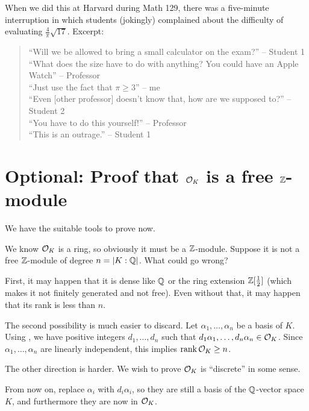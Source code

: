 \begin{remark}
	When we did this at Harvard during Math 129,
	there was a five-minute interruption in which students (jokingly) complained
	about the difficulty of evaluating $\frac{4}{\pi} \sqrt{17}$. Excerpt:
	\begin{quotation}
		\footnotesize
		``Will we be allowed to bring a small calculator on the exam?'' -- Student 1 \\
		``What does the size have to do with anything?  You could have an Apple Watch'' -- Professor \\
		``Just use the fact that $\pi \ge 3$'' -- me \\
		``Even [other professor] doesn't know that, how are we supposed to?'' -- Student 2 \\
		``You have to do this yourself!'' -- Professor \\
		``This is an outrage.'' -- Student 1
	\end{quotation}
\end{remark}

\section{Optional: Proof that $\mathcal O_K$ is a free $\mathbb Z$-module}

We have the suitable tools to prove  now.

We know $\mathcal O_K$ is a ring, so obviously it must be a $\mathbb Z$-module.
Suppose it is not a free $\mathbb Z$-module of degree $n = |K:\mathbb Q|$. What could go wrong?
\begin{itemize}
	\ii First, it may happen that it is dense like $\mathbb Q$ or the ring extension $\mathbb Z[\frac{1}{2}]$
	(which makes it not finitely generated and not free).
	\ii Even without that, it may happen that its rank is less than $n$.
\end{itemize}

The second possibility is much easier to discard.
Let $\alpha_1, \dots, \alpha_n$ be a basis of $K$.
Using , we have positive integers $d_1, \dots, d_n$ such that
$d_1 \alpha_1, \dots, d_n \alpha_n \in \mathcal O_K$.
Since $\alpha_1, \dots, \alpha_n$ are linearly independent,
this implies $\operatorname{rank} \mathcal O_K \geq n$.

The other direction is harder. We wish to prove $\mathcal O_K$ is ``discrete'' in some sense.

From now on, replace $\alpha_i$ with $d_i \alpha_i$, so they are still a basis of the $\mathbb Q$-vector
space $K$, and furthermore they are now in $\mathcal O_K$.

